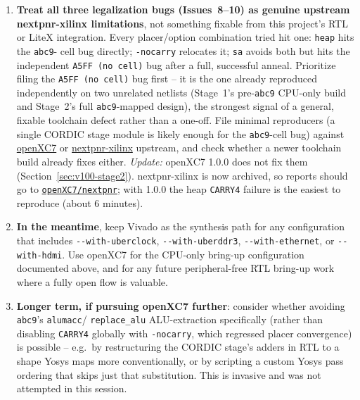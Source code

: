 \documentclass[11pt]{article}
\begin{document}
\begin{enumerate}
  \item \textbf{Treat all three legalization bugs (Issues~8--10) as
  genuine upstream nextpnr-xilinx limitations}, not something fixable
  from this project's RTL or LiteX integration. Every placer/option
  combination tried hit one: \lstinline{heap} hits the \lstinline{abc9}-
  cell bug directly; \lstinline{-nocarry} relocates it; \lstinline{sa}
  avoids both but hits the independent \lstinline{A5FF (no cell)} bug
  after a full, successful anneal. Prioritize filing the
  \lstinline{A5FF (no cell)} bug first -- it is the one already
  reproduced independently on two unrelated netlists (Stage~1's
  pre-\lstinline{abc9} CPU-only build and Stage~2's full
  \lstinline{abc9}-mapped design), the strongest signal of a general,
  fixable toolchain defect rather than a one-off. File minimal
  reproducers (a single CORDIC stage module is likely enough for the
  \lstinline{abc9}-cell bug) against
  \href{https://github.com/openXC7/toolchain-installer}{openXC7} or
  \href{https://github.com/gatecat/nextpnr-xilinx}{nextpnr-xilinx}
  upstream, and check whether a newer toolchain build already fixes
  either. \emph{Update:} openXC7 1.0.0 does not fix them
  (Section~\ref{sec:v100-stage2}). nextpnr-xilinx is now archived, so
  reports should go to
  \href{https://github.com/openXC7/nextpnr}{\texttt{openXC7/nextpnr}};
  with 1.0.0 the heap \lstinline{CARRY4} failure is the easiest to
  reproduce (about 6 minutes).
  \item \textbf{In the meantime}, keep Vivado as the synthesis path for
  any configuration that includes \lstinline{--with-uberclock},
  \lstinline{--with-uberddr3}, \lstinline{--with-ethernet}, or
  \lstinline{--with-hdmi}. Use openXC7 for the CPU-only bring-up
  configuration documented above, and for any future peripheral-free RTL
  bring-up work where a fully open flow is valuable.
  \item \textbf{Longer term, if pursuing openXC7 further}: consider
  whether avoiding \lstinline{abc9}'s \lstinline{alumacc}/
  \lstinline{replace_alu} ALU-extraction specifically (rather than
  disabling \lstinline{CARRY4} globally with \lstinline{-nocarry}, which
  regressed placer convergence) is possible -- e.g.\ by restructuring the
  CORDIC stage's adders in RTL to a shape Yosys maps more conventionally,
  or by scripting a custom Yosys pass ordering that skips just that
  substitution. This is invasive and was not attempted in this session.
\end{enumerate}
\end{document}
